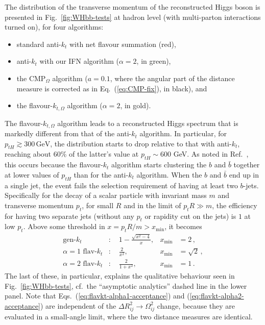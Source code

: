 \documentclass[nofootinbib,twocolumn,preprintnumbers,superscriptaddress,aps]{revtex4-2}
\newcommand{\GeV}{\,\text{GeV}}
\begin{document}
The distribution of the transverse momentum of the reconstructed Higgs boson
is presented in Fig.~\ref{fig:WHbb-tests} at hadron level (with multi-parton
interactions turned on), for four algorithms:
%
\begin{itemize}
\item standard anti-$k_t$ with net flavour summation (red),
\item anti-$k_t$ with our IFN algorithm ($\alpha=2$, in green),
\item the CMP$_\Omega$ algorithm ($a=0.1$, where the angular part of the distance measure
is corrected as in Eq.~(\ref{eq:CMP-fix}), in black), and
\item the flavour-$k_{t,\Omega}$ algorithm ($\alpha=2$, in gold).
\end{itemize}
%
The flavour-$k_{t,\Omega}$ algorithm leads to a reconstructed Higgs
spectrum that is markedly different from that of the anti-$k_t$
algorithm.
%
In particular, for $p_{tH} \gtrsim 300\GeV$, the distribution starts
to drop relative to that with anti-$k_t$, reaching about 60\% of the
latter's value at $p_{tH} \sim 600$ GeV.
%
As noted in Ref.~\cite{Behring:2020uzq}, this occurs 
% 
because the flavour-$k_t$ algorithm starts clustering the $b$ and
$\bar b$ together at lower values of $p_{tH}$ than for the anti-$k_t$
algorithm.
%
When the $b$ and $\bar b$ end up in a single jet, the event fails the
selection requirement of having at least two $b$-jets. 
%
Specifically for the decay of a scalar particle with invariant mass $m$ and
transverse momentum $p_t$, for small $R$ and in the limit of
$p_{t}R \gg m$, the efficiency for having two separate jets (without
any $p_{t}$ or rapidity cut on the jets) is $1$ at low $p_t$.
%
Above some threshold in $x = p_t R/m > x_{\min}$, it becomes
\begin{subequations}
  \label{eq:alg-acceptances}
\begin{align}
  \text{gen-$k_t$}&:\quad 1 - \frac{\sqrt{x^2-4}}{x}, &x_{\min} &= 2\,,
  \\
  \text{$\alpha=1$ flav-$k_t$}&:\quad \frac{2}{x^2}, &x_{\min} &= \sqrt{2}\,,
  \label{eq:flavkt-alpha1-acceptance}
  \\
  \text{$\alpha=2$ flav-$k_t$}&:\quad \frac{2}{1+x^2},& x_{\min} &= 1\,.
  \label{eq:flavkt-alpha2-acceptance}
\end{align}
\end{subequations}
The last of these, in particular, explains the qualitative behaviour
seen in Fig.~\ref{fig:WHbb-tests}, cf.\ the ``asymptotic analytics''
dashed line in the lower panel.
%
Note that Eqs.~(\ref{eq:flavkt-alpha1-acceptance}) and
(\ref{eq:flavkt-alpha2-acceptance}) are independent of the
$\Delta R_{ij}^2 \to \Omega_{ij}^2$ change, because they are evaluated
in a small-angle limit, where the two distance measures are identical.
\end{document}
